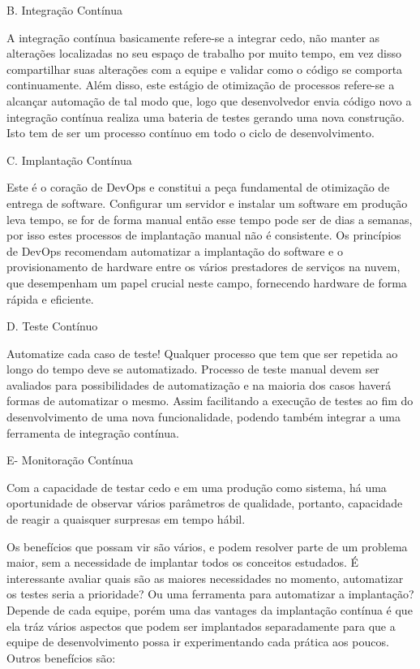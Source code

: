 \documentclass[12pt]{article}
\begin{document}
B. Integração Contínua

A integração contínua basicamente refere-se a integrar
cedo, não manter as alterações localizadas no seu
espaço de trabalho por muito tempo, em vez disso compartilhar suas alterações
com a equipe e validar como o código se comporta
continuamente. Além disso, este estágio de
otimização de processos refere-se a alcançar
automação de tal modo que, logo que desenvolvedor envia código novo a integração contínua
realiza uma bateria de testes gerando uma nova construção. Isto tem de ser um processo contínuo em todo o ciclo de desenvolvimento.

C. Implantação Contínua

Este é o coração de DevOps e constitui a peça fundamental
de otimização de entrega de software. Configurar um servidor e instalar um software em produção leva tempo, se for de forma manual então esse tempo pode ser de dias a semanas, por isso estes processos de implantação manual não é consistente. Os princípios de DevOps recomendam automatizar a implantação do software e o provisionamento de hardware entre os vários prestadores de serviços na nuvem, que desempenham um papel crucial neste campo, fornecendo hardware de forma rápida e eficiente.


D. Teste Contínuo

Automatize cada caso de teste! Qualquer processo que tem que ser repetida ao longo do tempo  deve se automatizado. Processo de teste manual devem ser avaliados para
possibilidades de automatização e na maioria dos casos
haverá formas de automatizar o mesmo. Assim facilitando a execução de testes ao fim do desenvolvimento de uma nova funcionalidade, podendo também integrar a uma ferramenta de integração contínua.


E- Monitoração Contínua

Com a capacidade de testar cedo e em uma produção como
sistema, há uma oportunidade de observar vários
parâmetros de qualidade, portanto, capacidade de
reagir a quaisquer surpresas em tempo hábil.


Os benefícios que possam vir são vários, e podem resolver parte de um problema maior, sem a necessidade de implantar todos os conceitos estudados. É interessante avaliar quais são as maiores necessidades no momento, automatizar os testes seria a prioridade? Ou uma ferramenta para automatizar a implantação? Depende de cada equipe, porém uma das vantages da implantação contínua é que ela tráz vários aspectos que podem ser implantados separadamente para que a equipe de desenvolvimento possa ir experimentando cada prática aos poucos. Outros benefícios são:
\end{document}
